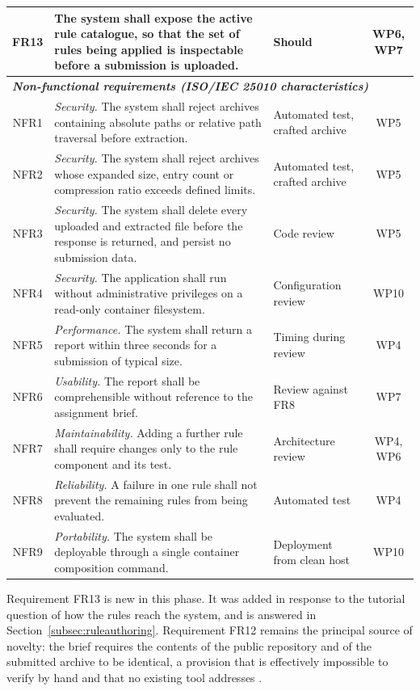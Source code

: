 \documentclass[a4paper,11pt]{article}
\begin{document}
\begin{table}[H]
\begin{tabularx}{\textwidth}{|c|X|p{2.5cm}|c|}
\hline
FR13 & The system shall expose the active rule catalogue, so that the set of rules being applied is inspectable before a submission is uploaded. & Should & WP6, WP7 \\
\hline
\hline
\multicolumn{4}{|l|}{\cellcolor{blue!8}\textit{\textbf{Non-functional requirements (ISO/IEC 25010 characteristics)}}} \\
\hline
NFR1 & \textit{Security.} The system shall reject archives containing absolute paths or relative path traversal before extraction. & Automated test, crafted archive & WP5 \\
\hline
NFR2 & \textit{Security.} The system shall reject archives whose expanded size, entry count or compression ratio exceeds defined limits. & Automated test, crafted archive & WP5 \\
\hline
NFR3 & \textit{Security.} The system shall delete every uploaded and extracted file before the response is returned, and persist no submission data. & Code review & WP5 \\
\hline
NFR4 & \textit{Security.} The application shall run without administrative privileges on a read-only container filesystem. & Configuration review & WP10 \\
\hline
NFR5 & \textit{Performance.} The system shall return a report within three seconds for a submission of typical size. & Timing during review & WP4 \\
\hline
NFR6 & \textit{Usability.} The report shall be comprehensible without reference to the assignment brief. & Review against FR8 & WP7 \\
\hline
NFR7 & \textit{Maintainability.} Adding a further rule shall require changes only to the rule component and its test. & Architecture review & WP4, WP6 \\
\hline
NFR8 & \textit{Reliability.} A failure in one rule shall not prevent the remaining rules from being evaluated. & Automated test & WP4 \\
\hline
NFR9 & \textit{Portability.} The system shall be deployable through a single container composition command. & Deployment from clean host & WP10 \\
\hline
\end{tabularx}
\end{table}

Requirement FR13 is new in this phase. It was added in response to the tutorial
question of how the rules reach the system, and is answered in
Section~\ref{subsec:ruleauthoring}. Requirement FR12 remains the principal source
of novelty: the brief requires the contents of the public repository and of the
submitted archive to be identical, a provision that is effectively impossible to
verify by hand and that no existing tool addresses \citep{Paiva2022}.
\end{document}
